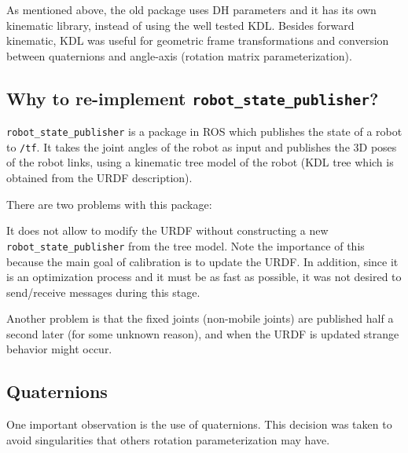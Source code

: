 As mentioned above, the old package uses DH parameters and it has its own kinematic library, instead of using the well tested KDL. Besides forward kinematic, KDL was useful for geometric frame transformations and conversion between quaternions and angle-axis (rotation matrix parameterization).



\subsection{Why to re-implement \texttt{robot\_state\_publisher}?}

\texttt{robot\_state\_publisher} is a package in ROS which publishes the state of a robot to \texttt{/tf}. It takes the joint angles of the robot as input and publishes the 3D poses of the robot links, using a kinematic tree model of the robot (KDL tree which is obtained from the URDF description).

There are two problems with this package:
\begin{itemize*}
 \item It does not allow to modify the URDF without constructing a new \texttt{robot\_state\_publisher} from the tree model. Note the importance of this because the main goal of calibration is to update the URDF. In addition, since it is an optimization process and it must be as fast as possible, it was not desired to send/receive messages during this stage.

 \item Another problem is that the fixed joints (non-mobile joints) are published half a second later (for some unknown reason), and when the URDF is updated strange behavior might occur.
\end{itemize*}

%
%
%
%
%

\subsection{Quaternions}

One important observation is the use of quaternions. This decision was taken to avoid singularities that others rotation parameterization may have.

